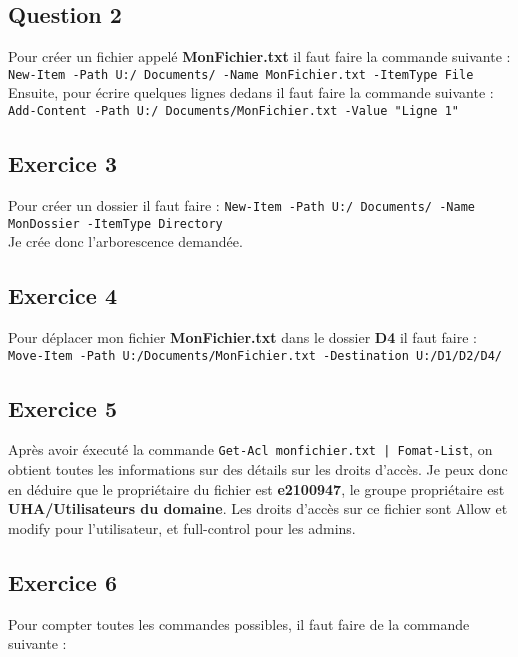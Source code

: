 \documentclass[12pt, a4paper]{article}
\begin{document}
\subsection{Question 2}
Pour créer un fichier appelé \textbf{MonFichier.txt} il faut faire la commande
suivante : \texttt{New-Item -Path U:/ Documents/ -Name MonFichier.txt -ItemType File}\\

Ensuite, pour écrire quelques lignes dedans il faut faire la commande suivante :\\

\texttt{Add-Content -Path U:/ Documents/MonFichier.txt -Value "Ligne 1"}\\

\subsection{Exercice 3}
Pour créer un dossier il faut faire : 
\texttt{New-Item -Path U:/ Documents/ -Name MonDossier -ItemType Directory}\\

Je crée donc l'arborescence demandée. 

\newpage
\subsection{Exercice 4}
Pour déplacer mon fichier \textbf{MonFichier.txt} dans le dossier \textbf{D4} il faut faire :\\

\texttt{Move-Item -Path U:/Documents/MonFichier.txt -Destination U:/D1/D2/D4/}\\

\subsection{Exercice 5}
Après avoir éxecuté la commande \texttt{Get-Acl monfichier.txt | Fomat-List}, 
on obtient toutes les informations sur des détails sur les droits d'accès. Je 
peux donc en déduire que le propriétaire du fichier est \textbf{e2100947}, le groupe
propriétaire est \textbf{UHA/Utilisateurs du domaine}. Les droits d'accès sur 
ce fichier sont Allow et modify pour l'utilisateur, et full-control pour les admins. 

\subsection{Exercice 6}
Pour compter toutes les commandes possibles, il faut faire de la commande suivante :\\
\end{document}
